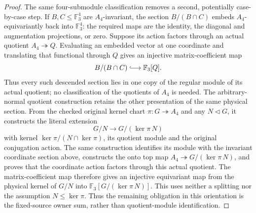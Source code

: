 \begin{proof}
The same four-submodule classification removes a second, potentially
case-by-case step.  If $B,C\leq\mathbb F_3^4$ are $A_4$-invariant, the
section $B/(B\cap C)$ embeds $A_4$-equivariantly back into
$\mathbb F_3^4$: the required maps are the identity, the diagonal and
augmentation projections, or zero.  Suppose its action factors through an
actual quotient $A_4\twoheadrightarrow Q$.  Evaluating an embedded vector
at one coordinate and translating that functional through $Q$ gives an
injective matrix-coefficient map
\[
 B/(B\cap C)\lhook\joinrel\longrightarrow \mathbb F_3[Q].
\]
Thus every such descended section lies in one copy of the regular module of
its actual quotient; no classification of the quotients of $A_4$ is needed.
The arbitrary-normal quotient construction retains the other presentation
of the same physical section.  From the checked original kernel chart
$\pi:G\twoheadrightarrow A_4$ and any $N\triangleleft G$, it constructs
the literal extension
\[
 G/N\longrightarrow G/(\ker\pi\,N)
\]
with kernel $\ker\pi/(N\cap\ker\pi)$, its quotient module and the original
conjugation action.  The same construction identifies its module with the
invariant coordinate section above, constructs the onto top map
$A_4\twoheadrightarrow G/(\ker\pi\,N)$, and proves that the coordinate action
factors through this actual quotient.  The matrix-coefficient map therefore
gives an injective equivariant map from the physical kernel of $G/N$ into
$\mathbb F_3[G/(\ker\pi\,N)]$.  This uses neither a splitting nor the
assumption $N\leq\ker\pi$.  Thus the remaining obligation in this orientation
is the fixed-source owner sum, rather than quotient-module identification.


\end{proof}

